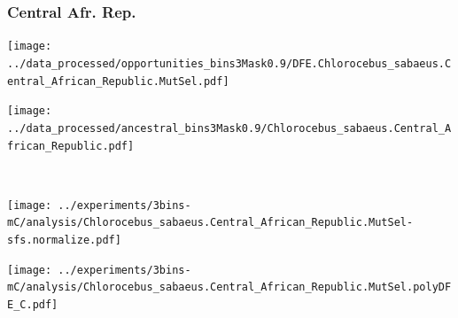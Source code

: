 \subsubsection{Central Afr. Rep.}

\begin{minipage}{0.49\linewidth}
    \texttt{[image: ../data\_processed/opportunities\_bins3Mask0.9/DFE.Chlorocebus\_sabaeus.Central\_African\_Republic.MutSel.pdf]}
\end{minipage}
\begin{minipage}{0.49\linewidth}
    \texttt{[image: ../data\_processed/ancestral\_bins3Mask0.9/Chlorocebus\_sabaeus.Central\_African\_Republic.pdf]}
\end{minipage}
\\
\begin{minipage}{0.49\linewidth}
    \texttt{[image: ../experiments/3bins-mC/analysis/Chlorocebus\_sabaeus.Central\_African\_Republic.MutSel-sfs.normalize.pdf]}
\end{minipage}
\begin{minipage}{0.4\linewidth}
    \texttt{[image: ../experiments/3bins-mC/analysis/Chlorocebus\_sabaeus.Central\_African\_Republic.MutSel.polyDFE\_C.pdf]}
\end{minipage}
